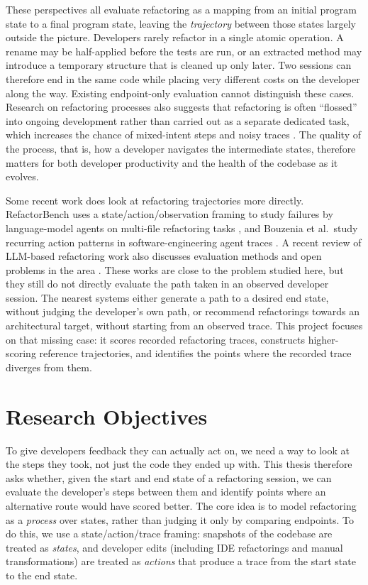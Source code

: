 These perspectives all evaluate refactoring as a mapping from an initial program state to a final program state, leaving the \textit{trajectory} between those states largely outside the picture. Developers rarely refactor in a single atomic operation. A rename may be half-applied before the tests are run, or an extracted method may introduce a temporary structure that is cleaned up only later. Two sessions can therefore end in the same code while placing very different costs on the developer along the way. Existing endpoint-only evaluation cannot distinguish these cases. Research on refactoring processes also suggests that refactoring is often ``flossed'' into ongoing development rather than carried out as a separate dedicated task, which increases the chance of mixed-intent steps and noisy traces \cite{murphyhill2009howrefactor}. The quality of the process, that is, how a developer navigates the intermediate states, therefore matters for both developer productivity and the health of the codebase as it evolves.

Some recent work does look at refactoring trajectories more directly. RefactorBench uses a state/action/observation framing to study failures by language-model agents on multi-file refactoring tasks \cite{gautam2025refactorbench}, and Bouzenia et al.\ study recurring action patterns in software-engineering agent traces \cite{bouzenia2025trajectories}. A recent review of LLM-based refactoring work also discusses evaluation methods and open problems in the area \cite{alomar2025slr}. These works are close to the problem studied here, but they still do not directly evaluate the path taken in an observed developer session. The nearest systems either generate a path to a desired end state, without judging the developer's own path, or recommend refactorings towards an architectural target, without starting from an observed trace. This project focuses on that missing case: it scores recorded refactoring traces, constructs higher-scoring reference trajectories, and identifies the points where the recorded trace diverges from them.

\section{Research Objectives}

To give developers feedback they can actually act on, we need a way to look at the steps they took, not just the code they ended up with. This thesis therefore asks whether, given the start and end state of a refactoring session, we can evaluate the developer's steps between them and identify points where an alternative route would have scored better. The core idea is to model refactoring as a \textit{process} over states, rather than judging it only by comparing endpoints. To do this, we use a state/action/trace framing: snapshots of the codebase are treated as \textit{states}, and developer edits (including IDE refactorings and manual transformations) are treated as \textit{actions} that produce a trace from the start state to the end state.

